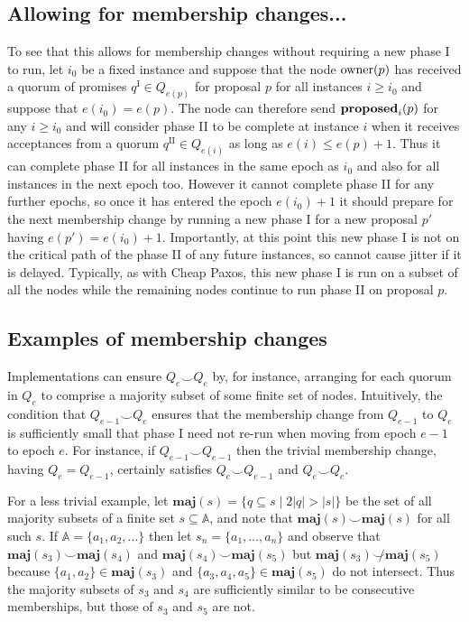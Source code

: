 \documentclass[journal]{IEEEtran}
\begin{document}
\subsection{Allowing for membership changes...}

To see that this allows for membership changes without requiring a new phase I
to run, let $i_0$ be a fixed instance and suppose that the node $\mathrm{owner}(p)$ has
received a quorum of promises $q^\textrm{I} \in Q_{e(p)}$ for proposal $p$ for
all instances $i \ge i_0$ and suppose that $e(i_0) = e(p)$. The node can
therefore send $\mathbf{proposed}_{i}(p)$ for any $i \ge i_0$ and will consider phase II to
be complete at instance $i$ when it receives acceptances from a quorum
$q^\textrm{II} \in Q_{e(i)}$ as long as $e(i) \le e(p) + 1$. Thus it can
complete phase II for all instances in the same epoch as $i_0$ and also for all
instances in the next epoch too.  However it cannot complete phase II for any
further epochs, so once it has entered the epoch $e(i_0) + 1$ it should prepare
for the next membership change by running a new phase I for a new proposal $p'$
having $e(p') = e(i_0) + 1$. Importantly, at this point this new phase I is not
on the critical path of the phase II of any future instances, so cannot cause
jitter if it is delayed. Typically, as with Cheap Paxos, this new phase I is
run on a subset of all the nodes while the remaining nodes continue to run
phase II on proposal $p$.


\subsection{Examples of membership changes}\label{types-of-membership-change}

\def\maj#1{\mathbf{maj}(#1)}

Implementations can ensure $Q_e \smile Q_e$ by, for instance, arranging for
each quorum in $Q_e$ to comprise a majority subset of some finite set of nodes.
Intuitively, the condition that $Q_{e-1} \smile Q_e$ ensures that the
membership change from $Q_{e-1}$ to $Q_e$ is sufficiently small that phase I
need not re-run when moving from epoch $e-1$ to epoch $e$.  For instance, if
$Q_{e-1} \smile Q_{e-1}$ then the trivial membership change, having $Q_e =
Q_{e-1}$, certainly satisfies $Q_e \smile Q_{e-1}$ and $Q_e \smile Q_e$.

For a less trivial example, let $\maj{s} = \{ q \subseteq s \mid 2 |q| > |s|
\}$ be the set of all majority subsets of a finite set $s \subseteq \mathbb A$,
and note that $\maj{s} \smile \maj{s}$ for all such $s$.  If $\mathbb A = \{
a_1, a_2, \ldots \}$ then let $s_n = \{a_1, \ldots, a_n\}$ and observe that
$\maj{s_3} \smile \maj{s_4}$ and $\maj{s_4} \smile \maj{s_5}$ but $\maj{s_3}
\not\smile \maj{s_5}$ because $\{a_1, a_2\} \in \maj{s_3}$ and $\{a_3, a_4,
a_5\} \in \maj{s_5}$ do not intersect. Thus the majority subsets of $s_3$ and
$s_4$ are sufficiently similar to be consecutive memberships, but those of
$s_3$ and $s_5$ are not.
\end{document}
